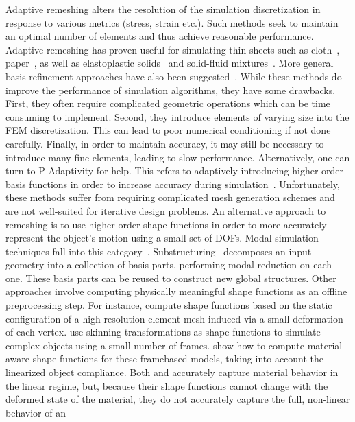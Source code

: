 Adaptive remeshing alters the resolution of the simulation discretization
in response to various metrics (stress, strain etc.). Such methods
seek to maintain an optimal number of elements and thus achieve
reasonable performance. Adaptive remeshing has proven useful
for simulating thin sheets such as cloth~\citep{Narain2012}, paper~\citep{Narain2013}, as well as elastoplastic solids~\citep{Wicke:2010} and solid-fluid mixtures~\citep{Clausen2013}.
More general basis refinement approaches have also been suggested~\citep{Debunne2001,Grinspun2002}.
While these methods do improve
the performance of simulation algorithms, they have some drawbacks.
First, they often require complicated geometric operations
which can be time consuming to implement.
Second, they introduce elements of varying size into the FEM discretization.
This can lead to poor numerical conditioning if not done carefully.
Finally, in order to maintain accuracy, it may still be necessary to introduce many
fine elements, leading to slow performance.
Alternatively, one can turn to P-Adaptivity for help.
This refers to adaptively introducing higher-order basis functions 
in order to increase accuracy during simulation~\citep{Szabo2004}.
Unfortunately, these methods suffer from requiring complicated mesh generation schemes and are not
well-suited for iterative design problems.
An alternative approach to remeshing is to use higher order shape
functions in order to more accurately represent the object's motion
using a small set of DOFs. Modal simulation techniques fall into
this category~\citep{Shabana1991,Krysl2001,Barbic:subspace:2005}.
Substructuring~\citep{Barbic2011} decomposes an input
geometry into a collection of basis parts, performing modal reduction on each one.
These basis parts can be reused to construct new global structures.
Other approaches involve computing physically meaningful shape functions as an
offline preprocessing step.
For instance, \cite{Nesme2009} compute shape functions based on
the static configuration of a high resolution element mesh induced
via a small deformation of each vertex.
\cite{Faure2011} use skinning transformations as shape functions to simulate complex
objects using a small number of frames.
\cite{Gilles2011} show how to compute material aware shape functions for these framebased
models, taking into account the linearized object compliance.
Both \cite{Nesme2009} and \cite{Faure2011} accurately capture
material behavior in the linear regime, 
but, because their shape functions cannot change with the deformed state of the material,
they do not accurately capture the full, non-linear behavior of an
